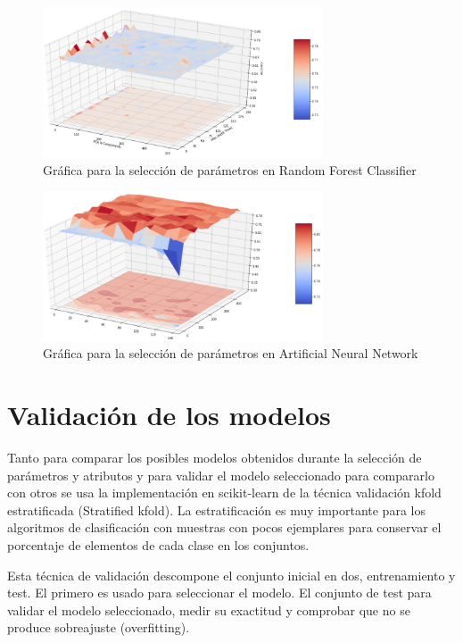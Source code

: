 \begin{figure}[H]
\centering
\includegraphics[width=0.74\textwidth]{figs/forest_3d.png}
\caption{Gráfica para la selección de parámetros en  Random Forest Classifier}
\label{figure:forest3d}
\end{figure}

\begin{figure}[H]
\centering
\includegraphics[width=0.74\textwidth]{figs/ann_3d.png}
\caption{Gráfica para la selección de parámetros en  Artificial Neural Network}
\label{figure:ann3d}
\end{figure}


\section{Validación de los modelos}
\label{section:validacion}
Tanto para comparar los posibles modelos obtenidos durante la selección de parámetros y atributos y para validar el modelo seleccionado para compararlo con otros se usa la implementación en scikit-learn de la técnica validación \gls{kfold} estratificada (Stratified \gls{kfold}). La estratificación es muy importante para los algoritmos de clasificación con muestras con pocos ejemplares para conservar el porcentaje de elementos de cada clase en los conjuntos.

Esta técnica de validación descompone el conjunto inicial en dos, entrenamiento y test. El primero es usado para seleccionar el modelo. El conjunto de test para validar el modelo seleccionado, medir su exactitud y comprobar que no se produce sobreajuste (overfitting).

